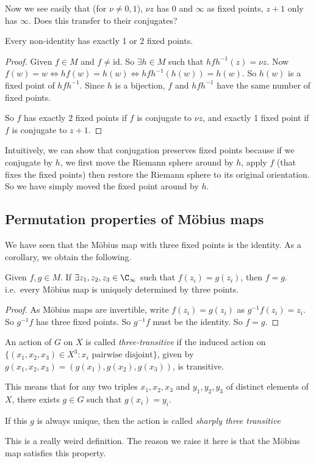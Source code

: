 \documentclass[a4paper]{article}
\begin{document}
Now we see easily that (for $\nu \not= 0, 1$), $\nu z$ has $0$ and $\infty$ as fixed points, $z + 1$ only has $\infty$. Does this transfer to their conjugates?

\begin{prop}
  Every non-identity has exactly 1 or 2 fixed points.
\end{prop}

\begin{proof}
  Given $f\in M$ and $f\not= \mathrm{id}$. So $\exists h\in M$ such that $hfh^{-1}(z) = \nu{z}$. Now $f(w) = w \Leftrightarrow hf(w) = h(w) \Leftrightarrow hfh^{-1}(h(w)) = h(w)$. So $h(w)$ is a fixed point of $hfh^{-1}$. Since $h$ is a bijection, $f$ and $hfh^{-1}$ have the same number of fixed points.

  So $f$ has exactly $2$ fixed points if $f$ is conjugate to $\nu z$, and exactly 1 fixed point if $f$ is conjugate to $z + 1$.
\end{proof}
Intuitively, we can show that conjugation preserves fixed points because if we conjugate by $h$, we first move the Riemann sphere around by $h$, apply $f$ (that fixes the fixed points) then restore the Riemann sphere to its original orientation. So we have simply moved the fixed point around by $h$.

\subsection{Permutation properties of M\texorpdfstring{\"o}{o}bius maps}
We have seen that the M\"obius map with three fixed points is the identity. As a corollary, we obtain the following.

\begin{prop}
  Given $f, g\in M$. If $\exists z_1, z_2, z_3\in \C_{\infty}$ such that $f(z_i) = g(z_i)$, then $f = g$. i.e.\ every M\"obius map is uniquely determined by three points.
\end{prop}

\begin{proof}
  As M\"obius maps are invertible, write $f(z_i) = g(z_i)$ as $g^{-1}f(z_i) = z_i$. So $g^{-1}f$ has three fixed points. So $g^{-1}f$ must be the identity. So $f = g$.
\end{proof}

\begin{defi}
  An action of $G$ on $X$ is called \emph{three-transitive} if the induced action on $\{(x_1, x_2, x_3)\in X^3: x_i\text{ pairwise disjoint}\}$, given by $g(x_1, x_2, x_3) = (g(x_1), g(x_2), g(x_3))$, is transitive.

  This means that for any two triples $x_1, x_2, x_3$ and $y_1, y_2, y_3$ of distinct elements of $X$, there exists $g\in G$ such that $g(x_i) = y_i$.

  If this $g$ is always unique, then the action is called \emph{sharply three transitive}
\end{defi}
This is a really weird definition. The reason we raise it here is that the M\"obius map satisfies this property.
\end{document}
